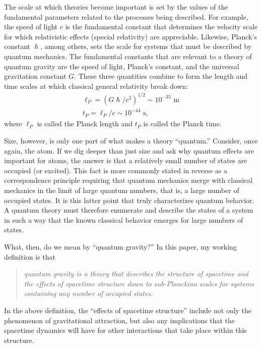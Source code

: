 The scale at which theories become important is set by the values of the
fundamental parameters related to the processes being described. For
example, the speed of light $c$ is the fundamental constant that determines
the velocity scale for which relativistic effects (special relativity) are
appreciable. Likewise, Planck's constant $\hslash $, among others, sets the
scale for systems that must be described by quantum mechanics. The
fundamental constants that are relevant to a theory of quantum gravity are
the speed of light, Planck's constant, and the universal gravitation
constant $G$. These three quantities combine to form the length and time
scales at which classical general relativity break down: 
\begin{equation}
\left. 
\begin{array}{l}
\ell _P=\left( G\hslash /c^3\right) ^{1/2}\sim 10^{-35}\text{ m} \\ 
t_P=\ell _P/c\sim 10^{-44}\text{ s,}
\end{array}
\right.  \label{1}
\end{equation}
where $\ell _P$ is called the Planck length and $t_P$ is called the Planck
time.

Size, however, is only one part of what makes a theory ``quantum.''
Consider, once again, the atom. If we dig deeper than just size and ask why
quantum effects are important for atoms, the answer is that a relatively
small number of states are occupied (or excited). This fact is more commonly
stated in reverse as a correspondence principle requiring that quantum
mechanics merge with classical mechanics in the limit of large quantum
numbers, that is, a large number of occupied states. It is this latter point
that truly characterizes quantum behavior. A quantum theory must therefore
enumerate and describe the states of a system in such a way that the known
classical behavior emerges for large numbers of states.

What, then, do we mean by ``quantum gravity?'' In this paper, my working
definition is that

\begin{quotation}
{\it quantum gravity is a theory that describes the structure of spacetime
and the effects of spacetime structure down to sub-Planckian scales for
systems containing any number of occupied states.}
\end{quotation}

\noindent In the above definition, the ``effects of spacetime structure''
include not only the phenomenon of gravitational attraction, but also any
implications that the spacetime dynamics will have for other interactions
that take place within this structure.

